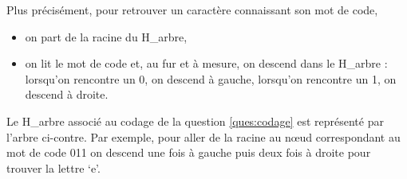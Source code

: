 \medskip
\begin{minipage}{0.40\textwidth}
\vspace{0pt}
Plus précisément, pour retrouver un caractère connaissant son mot de code, 

\begin{itemize}
  \item on part de la racine du H\_arbre,
  \item on lit le mot de code et, au fur et à mesure, on descend dans le H\_arbre : lorsqu’on rencontre un 0, on descend à gauche, lorsqu’on rencontre un 1, on descend à droite.
\end{itemize}
Le H\_arbre associé au codage de la question \ref{ques:codage} est représenté par l'arbre ci-contre.
Par exemple, pour aller de la racine au nœud correspondant au mot de code 011 on descend une fois à
gauche puis deux fois à droite pour trouver la lettre ‘e’.
\end{minipage}
\begin{minipage}{0.60\textwidth}
\vspace{0pt}
\begin{center}
\end{center}
\end{minipage}
